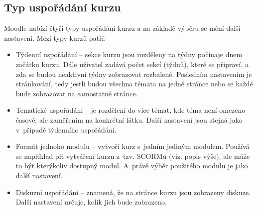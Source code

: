 \documentclass[
print,
  11pt,
  table,   
  nolof,    
  nolot,
  oneside,
  draft
]{fithesis3}
\begin{document}
\subsection*{Typ uspořádání kurzu}
Moodle nabízí čtyři typy uspořádání kurzu a na základě výběru se mění další nastavení. Mezi typy kurzů patří:
\begin{itemize}
	\item Týdenní uspořádání -- sekce kurzu jsou rozděleny na týdny počínaje dnem začátku kurzu. Dále uživatel zadává počet sekcí (týdnů), které se připraví, a zda se budou neaktivní týdny zobrazovat rozbalené. Posledním nastavením je stránkování, tedy jestli budou všechna témata na jedné stránce nebo se každé bude zobrazovat na samostatné stránce.
	\item Tematické uspořádání -- je rozdělení do více témat, kde téma není omezeno časově, ale zaměřením na konkrétní látku. Další nastavení jsou stejná jako v~případě týdenního uspořádání.
	\item Formát jednoho modulu -- vytvoří kurz s~jedním jediným modulem. Používá se například při vytváření kurzu z~tzv. SCORMů (viz. popis výše), ale může to být kterýkoliv dostupný modul. A~právě výběr použitého modulu je jako další nastavení.
	\item Diskuzní uspořádání -- znamená, že na stránce kurzu jsou zobrazeny diskuze. Další nastavení určuje, kolik jich bude zobrazeno.
\end{itemize}
\end{document}
